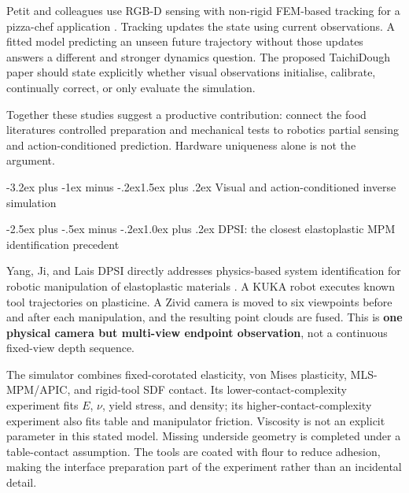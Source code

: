 \documentclass[
  11pt,
]{article}
\makeatletter
\renewcommand\section{\needspace{7\baselineskip}\@startsection{section}{1}{\z@}%
  {-3.2ex plus -1ex minus -.2ex}{1.5ex plus .2ex}%
  {\normalfont\sffamily\Large\bfseries\color{accent}}}
\renewcommand\subsection{\needspace{5\baselineskip}\@startsection{subsection}{2}{\z@}%
  {-2.5ex plus -.5ex minus -.2ex}{1.0ex plus .2ex}%
  {\normalfont\sffamily\large\bfseries\color{accent}}}
\makeatother
\begin{document}
Petit and colleagues use RGB-D sensing with non-rigid FEM-based tracking
for a pizza-chef application .
Tracking updates the state using current observations. A fitted model
predicting an unseen future trajectory without those updates answers a
different and stronger dynamics question. The proposed TaichiDough paper
should state explicitly whether visual observations initialise,
calibrate, continually correct, or only evaluate the simulation.

Together these studies suggest a productive contribution: connect the
food literature\textquotesingle s controlled preparation and mechanical
tests to robotics\textquotesingle{} partial sensing and
action-conditioned prediction. Hardware uniqueness alone is not the
argument.

\section{Visual and action-conditioned inverse
simulation}\label{visual-and-action-conditioned-inverse-simulation}

\subsection{DPSI: the closest elastoplastic MPM identification
precedent}\label{dpsi-the-closest-elastoplastic-mpm-identification-precedent}

Yang, Ji, and Lai\textquotesingle s DPSI directly addresses
physics-based system identification for robotic manipulation of
elastoplastic materials . A KUKA robot
executes known tool trajectories on plasticine. A Zivid camera is moved
to six viewpoints before and after each manipulation, and the resulting
point clouds are fused. This is \textbf{one physical camera but
multi-view endpoint observation}, not a continuous fixed-view depth
sequence.

The simulator combines fixed-corotated elasticity, von Mises plasticity,
MLS-MPM/APIC, and rigid-tool SDF contact. Its lower-contact-complexity
experiment fits \(E\), \(\nu\), yield stress, and density; its
higher-contact-complexity experiment also fits table and manipulator
friction. Viscosity is not an explicit parameter in this stated model.
Missing underside geometry is completed under a table-contact
assumption. The tools are coated with flour to reduce adhesion, making
the interface preparation part of the experiment rather than an
incidental detail.
\end{document}

